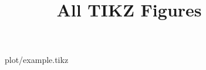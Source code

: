 \documentclass{../config/paper}
\title{All TIKZ Figures}
\begin{document}
\begin{figure*}
\centering

\caption{plot/example.tikz}
\end{figure*}
\end{document}
